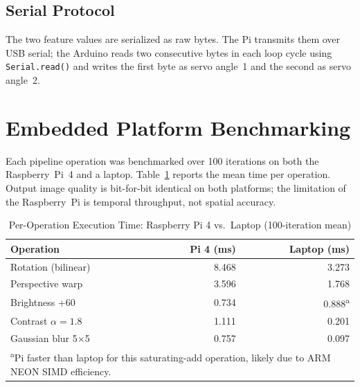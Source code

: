 \documentclass[conference]{IEEEtran}
\begin{document}
\subsection{Serial Protocol}

The two feature values are serialized as raw bytes. The Pi transmits them
over USB serial; the Arduino reads two consecutive bytes in each loop cycle
using \texttt{Serial.read()} and writes the first byte as servo angle~1 and
the second as servo angle~2.

\section{Embedded Platform Benchmarking}
\label{sec:bench}

Each pipeline operation was benchmarked over 100 iterations on both the
Raspberry~Pi~4 and a laptop. Table~\ref{tab:bench} reports the mean time
per operation. Output image quality is bit-for-bit identical on both platforms;
the limitation of the Raspberry~Pi is temporal throughput, not spatial accuracy.

\begin{table}[htbp]
  \caption{Per-Operation Execution Time: Raspberry Pi 4 vs.\ Laptop (100-iteration mean)}
  \label{tab:bench}
  \begin{center}
    \begin{tabular}{lrr}
      \toprule
      \textbf{Operation} & \textbf{Pi 4 (ms)} & \textbf{Laptop (ms)} \\
      \midrule
      Rotation (bilinear)     & 8.468 & 3.273 \\
      Perspective warp        & 3.596 & 1.768 \\
      Brightness +60          & 0.734 & 0.888\textsuperscript{a} \\
      Contrast \(\alpha=1.8\) & 1.111 & 0.201 \\
      Gaussian blur 5\(\times\)5 & 0.757 & 0.097 \\
      \bottomrule
      \multicolumn{3}{l}{\textsuperscript{a}Pi faster than laptop for this saturating-add
        operation, likely due to ARM NEON SIMD efficiency.}
    \end{tabular}
  \end{center}
\end{table}

\end{document}

